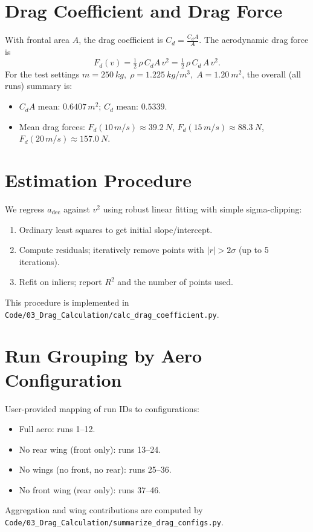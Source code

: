 \documentclass[11pt,a4paper]{article}
\begin{document}
\section{Drag Coefficient and Drag Force}
With frontal area \(A\), the drag coefficient is \(C_d = \tfrac{C_dA}{A}\). The aerodynamic drag force is
\begin{equation}
  F_d(v) = \tfrac{1}{2}\,\rho\,C_dA\,v^2 = \tfrac{1}{2}\,\rho\,C_d\,A\,v^2.
\end{equation}
For the test settings \(m=\SI{250}{kg},\;\rho=\SI{1.225}{kg/m^3},\;A=\SI{1.20}{m^2}\), the overall (all runs) summary is:
\begin{itemize}
  \item \(C_dA\) mean: \(0.6407\,\si{m^2}\); \(C_d\) mean: \(0.5339\).
  \item Mean drag forces: \(F_d(10\,\si{m/s})\approx\SI{39.2}{N}\), \(F_d(15\,\si{m/s})\approx\SI{88.3}{N}\), \(F_d(20\,\si{m/s})\approx\SI{157.0}{N}\).
\end{itemize}

\section{Estimation Procedure}
We regress \(a_\text{dec}\) against \(v^2\) using robust linear fitting with simple sigma-clipping:
\begin{enumerate}
  \item Ordinary least squares to get initial slope/intercept.
  \item Compute residuals; iteratively remove points with \(|r|>2\sigma\) (up to 5 iterations).
  \item Refit on inliers; report \(R^2\) and the number of points used.
\end{enumerate}
This procedure is implemented in \texttt{Code/03\_Drag\_Calculation/calc\_drag\_coefficient.py}.

\section{Run Grouping by Aero Configuration}
User-provided mapping of run IDs to configurations:
\begin{itemize}
  \item Full aero: runs 1--12.
  \item No rear wing (front only): runs 13--24.
  \item No wings (no front, no rear): runs 25--36.
  \item No front wing (rear only): runs 37--46.
\end{itemize}
Aggregation and wing contributions are computed by \texttt{Code/03\_Drag\_Calculation/summarize\_drag\_configs.py}.
\end{document}
